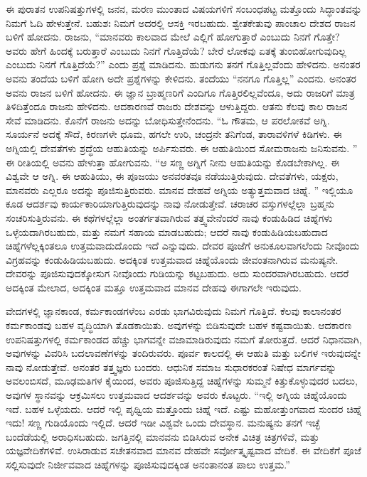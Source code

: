 \vskip 5pt

ಈ ಪುರಾತನ ಉಪನಿಷತ್ತುಗಳಲ್ಲಿ ಜನನ, ಮರಣ ಮುಂತಾದ ವಿಷಯಗಳಿಗೆ ಸಂಬಂಧಪಟ್ಟ ಮತ್ತೊಂದು ಸಿದ್ಧಾಂತವನ್ನು ನಿಮಗೆ ಓದಿ ಹೇಳುತ್ತೇನೆ. ಬಹುಶಃ ನಿಮಗೆ ಅದರಲ್ಲಿ ಆಸಕ್ತಿ ಇರಬಹುದು. ಶ್ವೇತಕೇತುವು ಪಾಂಚಾಲ ದೇಶದ ರಾಜನ ಬಳಿಗೆ ಹೋದನು. ರಾಜನು, “ಮಾನವರು ಕಾಲವಾದ ಮೇಲೆ ಎಲ್ಲಿಗೆ ಹೋಗುತ್ತಾರೆ ಎಂಬುದು ನಿನಗೆ ಗೊತ್ತೇ? ಅವರು ಹೇಗೆ ಹಿಂದಕ್ಕೆ ಬರುತ್ತಾರೆ ಎಂಬುದು ನಿನಗೆ ಗೊತ್ತಿದೆಯೆ? ಬೇರೆ ಲೋಕವು ಏತಕ್ಕೆ ತುಂಬಿಹೋಗುವುದಿಲ್ಲ ಎಂಬುದು ನಿನಗೆ ಗೊತ್ತಿದೆಯೆ?” ಎಂದು ಪ್ರಶ್ನೆ ಮಾಡಿದನು. ಹುಡುಗನು ತನಗೆ ಗೊತ್ತಿಲ್ಲವೆಂದು ಹೇಳಿದನು. ಅನಂತರ ಅವನು ತಂದೆಯ ಬಳಿಗೆ ಹೋಗಿ ಅದೇ ಪ್ರಶ್ನೆಗಳನ್ನು ಕೇಳಿದನು. ತಂದೆಯು “ನನಗೂ ಗೊತ್ತಿಲ್ಲ” ಎಂದನು. ಅನಂತರ ಅವನು ರಾಜನ ಬಳಿಗೆ ಹೋದನು. ಈ ಜ್ಞಾನ ಬ್ರಾಹ್ಮಣರಿಗೆ ಎಂದಿಗೂ ಗೊತ್ತಿರಲಿಲ್ಲವೆಂದೂ, ಅದು ರಾಜರಿಗೆ ಮಾತ್ರ ತಿಳಿದಿತ್ತೆಂದೂ ರಾಜನು ಹೇಳಿದನು. ಆದಕಾರಣವೆ ರಾಜರು ದೇಶವನ್ನು ಆಳುತ್ತಿದ್ದರು. ಆತನು ಕೆಲವು ಕಾಲ ರಾಜನ ಸೇವೆ ಮಾಡಿದನು. ಕೊನೆಗೆ ರಾಜನು ಅದನ್ನು ಬೋಧಿಸುತ್ತೇನೆಂದನು. “ಓ ಗೌತಮ, ಆ ಪರಲೋಕವೆ ಅಗ್ನಿ. ಸೂರ್ಯನೆ ಅದಕ್ಕೆ ಸೌದೆ, ಕಿರಣಗಳೇ ಧೂಮ, ಹಗಲೇ ಉರಿ, ಚಂದ್ರನೇ ತನಿಗೆಂಡ, ತಾರಾವಳಿಗಳೆ ಕಿಡಿಗಳು. ಈ ಅಗ್ನಿಯಲ್ಲಿ ದೇವತೆಗಳು ಶ್ರದ್ಧೆಯ ಆಹುತಿಯನ್ನು ಅರ್ಪಿಸುವರು. ಈ ಆಹುತಿಯಿಂದ ಸೋಮರಾಜನು ಜನಿಸುವನು. ” ಈ ರೀತಿಯಲ್ಲಿ ಅವನು ಹೇಳುತ್ತಾ ಹೋಗುವನು. “ಆ ಸಣ್ಣ ಅಗ್ನಿಗೆ ನೀನು ಆಹುತಿಯನ್ನು ಕೊಡಬೇಕಾಗಿಲ್ಲ. ಈ ವಿಶ್ವವೇ ಆ ಅಗ್ನಿ. ಈ ಆಹುತಿಯು, ಈ ಪೂಜಯು ಅನವರತವೂ ನಡೆಯುತ್ತಿರುವುದು. ದೇವತೆಗಳು, ಯಕ್ಷರು, ಮಾನವರು ಎಲ್ಲರೂ ಅದನ್ನು ಪೂಜಿಸುತ್ತಿರುವರು. ಮಾನವ ದೇಹವೆ ಅಗ್ನಿಯ ಅತ್ಯುತ್ತಮವಾದ ಚಿಹ್ನೆ. ” ಇಲ್ಲಿಯೂ ಕೂಡ ಆದರ್ಶವು ಕಾರ್ಯಕಾರಿಯಾಗುತ್ತಿರುವುದನ್ನು ನಾವು ನೋಡುತ್ತೇವೆ. ಚರಾಚರ ವಸ್ತುಗಳಲ್ಲೆಲ್ಲಾ ಬ್ರಹ್ಮನು ಸಂಚರಿಸುತ್ತಿರುವನು. ಈ ಕಥೆಗಳಲ್ಲೆಲ್ಲಾ ಅಂತರ್ಗತವಾಗಿರುವ ತತ್ತ್ವವೇನೆಂದರೆ ನಾವು ಕಂಡುಹಿಡಿದ ಚಿಹ್ನೆಗಳು ಒಳ್ಳೆಯದಾಗಿರಬಹುದು, ಮತ್ತು ನಮಗೆ ಸಹಾಯ ಮಾಡಬಹುದು; ಆದರೆ ನಾವು ಕಂಡುಹಿಡಿಯಬಹುದಾದ ಚಿಹ್ನೆಗಳೆಲ್ಲಕ್ಕಿಂತಲೂ ಉತ್ತಮವಾದುದೊಂದು ಇದೆ ಎನ್ನುವುದು. ದೇವರ ಪೂಜೆಗೆ ಅನುಕೂಲವಾಗಲೆಂದು ನೀವೊಂದು ವಿಗ್ರಹವನ್ನು ಕಂಡುಹಿಡಿಯಬಹುದು. ಅದಕ್ಕಿಂತ ಉತ್ತಮವಾದ ಚಿಹ್ನೆಯೊಂದು ಜೀವಂತನಾಗಿರುವ ಮನುಷ್ಯನೇ. ದೇವರನ್ನು ಪೂಜಿಸುವುದಕ್ಕೋಸುಗ ನೀವೊಂದು ಗುಡಿಯನ್ನು ಕಟ್ಟಬಹುದು. ಅದು ಸುಂದರವಾಗಿರಬಹುದು. ಆದರೆ ಅದಕ್ಕಿಂತ ಮೇಲಾದ, ಅದಕ್ಕಿಂತ ಮತ್ತೂ ಉತ್ತಮವಾದ ಮಾನವ ದೇಹವು ಈಗಾಗಲೇ ಇರುವುದು. 

\vskip 5pt

ವೇದಗಳಲ್ಲಿ ಜ್ಞಾನಕಾಂಡ, ಕರ್ಮಕಾಂಡಗಳೆಂಬ ಎರಡು ಭಾಗವಿರುವುದು ನಿಮಗೆ ಗೊತ್ತಿದೆ. ಕೆಲವು ಕಾಲಾನಂತರ ಕರ್ಮಕಾಂಡವು ಬಹಳ ವೃದ್ಧಿಯಾಗಿ ತೊಡಕಾಯಿತು. ಅವುಗಳನ್ನು ಬಿಡಿಸುವುದೇ ಬಹಳ ಕಷ್ಟವಾಯಿತು. ಆದಕಾರಣ ಉಪನಿಷತ್ತುಗಳಲ್ಲಿ ಕರ್ಮಕಾಂಡದ ಹೆಚ್ಚು ಭಾಗವನ್ನೇ ವಜಾಮಾಡಿರುವುದು ನಮಗೆ ತೋರುತ್ತದೆ. ಆದರೆ ನಿಧಾನವಾಗಿ, ಅವುಗಳನ್ನು ವಿವರಿಸಿ ಬದಲಾವಣೆಗಳನ್ನು ತಂದಿರುವರು. ಪೂರ್ವ ಕಾಲದಲ್ಲಿ ಈ ಆಹುತಿ ಮತ್ತು ಬಲಿಗಳ ಇರುವುದನ್ನೇ ನಾವು ನೋಡುತ್ತೇವೆ. ಅನಂತರ ತತ್ತ್ವಜ್ಞರು ಬಂದರು. ಆಧುನಿಕ ಸಮಾಜ ಸುಧಾರಕರಂತೆ ನಿಷೇಧ ಮಾರ್ಗವನ್ನು ಅವಲಂಬಿಸದೆ, ಮೂಢಮತಿಗಳ ಕೈಯಿಂದ, ಅವರು ಪೂಜಿಸುತ್ತಿದ್ದ ಚಿಹ್ನೆಗಳನ್ನು ಸುಮ್ಮನೆ ಕಿತ್ತುಕೊಳ್ಳುವುದರ ಬದಲು, ಅವುಗಳ ಸ್ಥಾನವನ್ನು ಆಕ್ರಮಿಸಲು ಉತ್ತಮವಾದ ಆದರ್ಶವನ್ನು ಅವರು ಕೊಟ್ಟರು. “ಇಲ್ಲಿ ಅಗ್ನಿಯ ಚಿಹ್ನೆಯೊಂದು ಇದೆ. ಬಹಳ ಒಳ್ಳೆಯದು. ಆದರೆ ಇಲ್ಲಿ ಪೃಥ್ವಿಯ ಮತ್ತೊಂದು ಚಿಹ್ನೆ ಇದೆ. ಎಷ್ಟು ಮಹೋತ್ತುಂಗವಾದ ಸುಂದರ ಚಿಹ್ನೆ ಇದು! ಸಣ್ಣ ಗುಡಿಯೊಂದು ಇಲ್ಲಿದೆ. ಆದರೆ ಇಡೀ ವಿಶ್ವವೇ ಒಂದು ದೇವಸ್ಥಾನ. ಮನುಷ್ಯನು ತನಗೆ ಇಚ್ಛೆ ಬಂದೆಡೆಯಲ್ಲಿ ಅರಾಧಿಸಬಹುದು. ಜಗತ್ತಿನಲ್ಲಿ ಮಾನವನು ಬಿಡಿಸಿರುವ ಅನೇಕ ವಿಚಿತ್ರ ಚಿತ್ರಗಳಿವೆ, ಮತ್ತು ಯಜ್ಞವೇದಿಕೆಗಳಿವೆ. ಉಸಿರಾಡುವ ಸಚೇತನವಾದ ಮಾನವ ದೇಹವೇ ಸರ್ವೋತ್ಕೃಷ್ಟವಾದ ವೇದಿಕೆ. ಈ ವೇದಿಕೆಗೆ ಪೂಜೆ ಸಲ್ಲಿಸುವುದೇ ನಿರ್ಜೀವವಾದ ಚಿಹ್ನೆಗಳನ್ನು ಪೂಜಿಸುವುದಕ್ಕಿಂತ ಅನಂತಾನಂತ ಪಾಲು ಉತ್ತಮ.”

